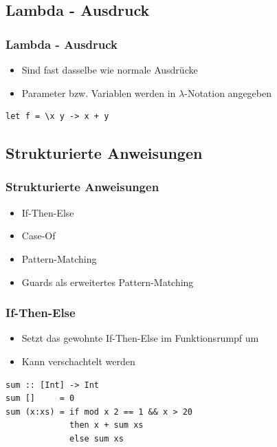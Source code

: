 \documentclass[fleqn,11pt,aspectratio=43]{beamer}
\begin{document}
\subsection{Lambda - Ausdruck}
\begin{frame}[fragile]
\frametitle{Lambda - Ausdruck}
\begin{block}{\vspace*{-2ex}}
\begin{itemize}
  \item Sind fast dasselbe wie normale Ausdrücke
  \item Parameter bzw. Variablen werden in $\lambda$-Notation angegeben
\end{itemize}
\end{block}
\begin{lstlisting}
let f = \x y -> x + y
\end{lstlisting}
\end{frame}

\subsection{Strukturierte Anweisungen}
\begin{frame}
\frametitle{Strukturierte Anweisungen}
\begin{block}{\vspace*{-2ex}}
\begin{itemize}
  \item If-Then-Else
  \item Case-Of
  \item Pattern-Matching
  \item Guards als erweitertes Pattern-Matching
\end{itemize}
\end{block}
\end{frame}

\begin{frame}[fragile]
\frametitle{If-Then-Else}
\begin{block}{\vspace*{-2ex}}
\begin{itemize}
  \item Setzt das gewohnte If-Then-Else im Funktionsrumpf um
  \item Kann verschachtelt werden
\end{itemize}
\begin{center}
\scalebox{0.7}{}
\end{center}
\end{block}
\begin{lstlisting}
sum :: [Int] -> Int
sum []     = 0
sum (x:xs) = if mod x 2 == 1 && x > 20 
             then x + sum xs
             else sum xs
\end{lstlisting}
\end{frame}
\end{document}
